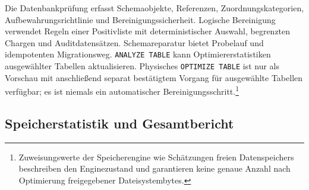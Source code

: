 \documentclass[11pt,a4paper]{article}
\newcommand{\codeword}[1]{\nolinkurl{#1}}
\begin{document}
Die Datenbankprüfung erfasst Schemaobjekte, Referenzen, Zuordnungskategorien,
Aufbewahrungsrichtlinie und Bereinigungssicherheit. Logische Bereinigung
verwendet Regeln einer Positivliste mit deterministischer Auswahl, begrenzten
Chargen und Auditdatensätzen. Schemareparatur bietet Probelauf und idempotenten
Migrationsweg. \codeword{ANALYZE TABLE} kann Optimiererstatistiken ausgewählter
Tabellen aktualisieren. Physisches \codeword{OPTIMIZE TABLE} ist nur als
Vorschau mit anschließend separat bestätigtem Vorgang für ausgewählte Tabellen
verfügbar; es ist niemals ein automatischer
Bereinigungsschritt.\footnote{Zuweisungswerte der Speicherengine wie Schätzungen
freien Datenspeichers beschreiben den Enginezustand und garantieren keine genaue
Anzahl nach Optimierung freigegebener Dateisystembytes.}

\subsection{Speicherstatistik und Gesamtbericht}
\end{document}
